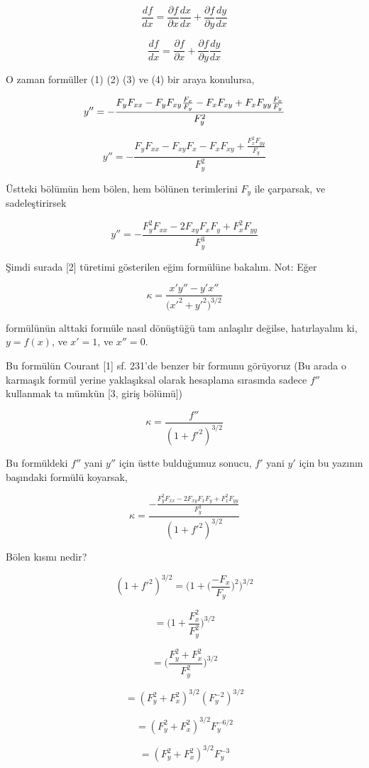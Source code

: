 \documentclass[12pt,fleqn]{article}\usepackage{../../common}
\begin{document}
$$ \frac{df}{dx} = \frac{\partial f}{\partial x} \frac{dx}{dx} + \frac{\partial f}{\partial y} \frac{dy}{dx}  $$

$$ \frac{df}{dx} = \frac{\partial f}{\partial x} + \frac{\partial f}{\partial y} \frac{dy}{dx}  $$

O zaman formüller (1) (2) (3) ve (4) bir araya konulursa,

$$ y '' = - \frac{F_yF_{xx} - F_y F_{xy}\frac{F_x}{F_y} - F_xF_{xy} + F_xF_{yy}\frac{F_x}{F_y}}{F_y^2}\\ $$

$$ y '' = - \frac{F_yF_{xx} - F_{xy}F_x - F_xF_{xy} + \frac{F_x^2F_{yy}}{F_y}}{F_y^2} $$

Üstteki bölümün hem bölen, hem bölünen terimlerini $F_y$ ile çarparsak, ve
sadeleştirirsek

$$ y '' = - \frac{F_y^2F_{xx} - 2F_{xy}F_xF_y + F_x^2F_{yy}}{F_y^3} $$

Şimdi surada [2] türetimi gösterilen eğim  formülüne
bakalım. Not: Eğer

$$ \kappa = \frac{x'y''-y'x''}{\bigg(x'^2 + y'^2 \bigg)^{3/2}} $$

formülünün alttaki formüle nasıl dönüştüğü tam anlaşılır değilse,
hatırlayalım ki, $y=f(x)$, ve $x'=1$, ve $x'' = 0$.

Bu formülün Courant [1] sf. 231'de benzer bir formunu görüyoruz (Bu arada o
karmaşık formül yerine yaklaşıksal olarak hesaplama sırasında sadece $f''$
kullanmak ta mümkün [3, giriş bölümü])

$$ \kappa = \frac{f''}{(1+f'^2)^{3/2}} $$

Bu formüldeki $f''$ yani $y''$ için üstte bulduğumuz sonucu, $f'$ yani $y'$
için bu yazının başındaki formülü koyarsak,

$$ 
\kappa = \frac
{-\frac
{\displaystyle F_y^2F_{xx} - 2F_{xy}F_xF_y +  F_x^2F_{yy}}{\displaystyle F_y^3}}
{(1+f'^2)^{3/2}} 
$$  

Bölen kısmı nedir?

$$ (1+f'^2)^{3/2} = \bigg( 1 + \bigg(\frac{-F_x}{F_y}\bigg)^2 \bigg)^{3/2}  $$

$$ = \bigg( 1 + \frac{F_x^2}{F_y^2} \bigg)^{3/2}  $$

$$ = \bigg( \frac{F_y^2 + F_x^2}{F_y^2} \bigg)^{3/2}  $$

$$ = (F_y^2 + F_x^2)^{3/2}(F_y^{-2})^{3/2}  $$

$$ = (F_y^2 + F_x^2)^{3/2}F_y^{-6/2}  $$

$$ = (F_y^2 + F_x^2)^{3/2}F_y^{-3} $$
\end{document}
